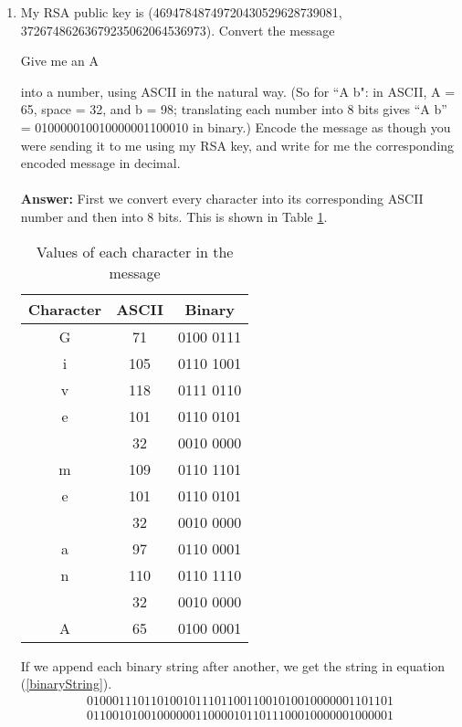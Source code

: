 \documentclass[tikz, 12pt]{scrartcl}
\begin{document}
\begin{enumerate}
	\item My RSA public key is (46947848749720430529628739081, 37267486263679235062064536973). Convert the message 
	\begin{center}
	Give me an A
	\end{center}
	into a number, using ASCII in the natural way. (So for ``A b": in ASCII, A = 65, space = 32, and b = 98; translating each number into 8 bits gives ``A b'' = 010000010010000001100010 in binary.) Encode the message as though you were sending it to me using my RSA key, and write for me the corresponding encoded message in decimal.\\
	\\
	\textbf{Answer: } First we convert every character into its corresponding ASCII number and then into 8 bits. This is shown in Table \ref{valuesForCharacter}.
	
	\begin{table}[ht!]
		\caption{\label{valuesForCharacter}Values of each character in the message}
		\centering
		\begin{tabular}{|c|c|c|}
			\hline
			Character		&	ASCII	&	Binary	\\
			\hline
			G			&	71		&	0100 0111	\\ %
			i			&	105		&	0110 1001	\\ %
			v			&	118		&	0111 0110	\\ %
			e			&	101		&	0110 0101	\\ %
						&	32		&	0010 0000\\ %
			m			&	109		&	0110 1101	\\ %
			e			&	101		&	0110 0101	\\ %
						&	32		&	0010 0000\\ %
			a			&	97		&	0110 0001	\\ %
			n			&	110		&	0110 1110	\\ %
						&	32		&	0010 0000\\ %
			A			&	65		&	0100 0001\\ %
			\hline
		\end{tabular}
	\end{table}
	
	If we append each binary string after another, we get the string in equation (\ref{binaryString}).
	\begin{equation}\label{binaryString}
	\begin{split}
	01000111	01101001 01110110 01100101 00100000 01101101 \\ 01100101 00100000 01100001 	01101110	00100000 01000001
	\end{split}
	\end{equation}
	

\end{enumerate}
\end{document}
